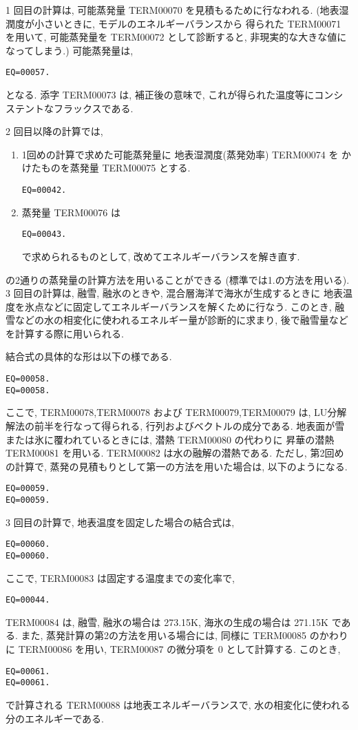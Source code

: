 1 回目の計算は, 可能蒸発量 TERM00070 を見積もるために行なわれる.
(地表湿潤度が小さいときに, モデルのエネルギーバランスから
得られた TERM00071 を用いて, 可能蒸発量を
TERM00072
として診断すると, 非現実的な大きな値になってしまう.)
可能蒸発量は,
\begin{verbatim}
EQ=00057.
\end{verbatim}
となる.
添字 TERM00073 は, 補正後の意味で, 
これが得られた温度等にコンシステントなフラックスである.
    
2 回目以降の計算では, 
\begin{enumerate}
\item 1回めの計算で求めた可能蒸発量に
      地表湿潤度(蒸発効率) TERM00074 を
      かけたものを蒸発量 TERM00075 とする.
      \begin{verbatim}
EQ=00042.
\end{verbatim}

\item 蒸発量 TERM00076 は
      \begin{verbatim}
EQ=00043.
\end{verbatim}
      で求められるものとして, 
      改めてエネルギーバランスを解き直す.
\end{enumerate}
の2通りの蒸発量の計算方法を用いることができる
(標準では1.の方法を用いる).
3 回目の計算は, 融雪, 融氷のときや, 混合層海洋で海氷が生成するときに
地表温度を氷点などに固定してエネルギーバランスを解くために行なう. 
このとき, 融雪などの水の相変化に使われるエネルギー量が診断的に求まり, 
後で融雪量などを計算する際に用いられる. 

結合式の具体的な形は以下の様である. 
%
\begin{verbatim}
EQ=00058.
EQ=00058.
\end{verbatim}
%
ここで, TERM00078,TERM00078 および TERM00079,TERM00079 は, 
LU分解解法の前半を行なって得られる, 行列およびベクトルの成分である. 
地表面が雪または氷に覆われているときには, 潜熱 TERM00080 の代わりに
昇華の潜熱 TERM00081 を用いる. TERM00082 は水の融解の潜熱である. 
%
ただし, 第2回めの計算で, 
蒸発の見積もりとして第一の方法を用いた場合は, 以下のようになる.
\begin{verbatim}
EQ=00059.
EQ=00059.
\end{verbatim}

3 回目の計算で, 地表温度を固定した場合の結合式は, 
\begin{verbatim}
EQ=00060.
EQ=00060.
\end{verbatim}
ここで, TERM00083 は固定する温度までの変化率で, 
\begin{verbatim}
EQ=00044.
\end{verbatim}
TERM00084 は, 融雪, 融氷の場合は 273.15K, 
海氷の生成の場合は 271.15K である. 
また, 蒸発計算の第2の方法を用いる場合には,
同様に TERM00085 のかわりに TERM00086 を用い,
TERM00087 の微分項を 0 として計算する.
このとき, 
\begin{verbatim}
EQ=00061.
EQ=00061.
\end{verbatim}
で計算される TERM00088 は地表エネルギーバランスで, 
水の相変化に使われる分のエネルギーである. 

